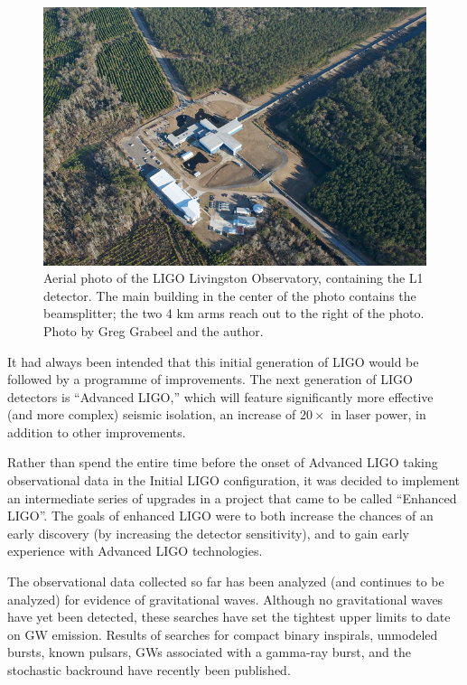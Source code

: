 \begin{figure}
\centerline{\includegraphics[width=0.8\columnwidth]{figures/5413583267_69eb527273_z.jpg}}
\caption[Aerial photo of LIGO Livingston Observatory]{
\label{fig:aerial-photo}Aerial photo of the LIGO Livingston Observatory, 
containing the L1 detector.  The main building in the center of the photo
contains the beamsplitter; the two 4 km arms reach out to the right of the 
photo.  Photo by Greg Grabeel and the author.  }
\end{figure}

It had always been intended that this initial generation of LIGO would
be followed by a programme of improvements\cite{Abramovici1992LIGO}.  The next generation of
LIGO detectors is ``Advanced LIGO,'' which will feature significantly
more effective (and more complex) seismic isolation, an increase of
$20\times$ in laser power, in addition to other improvements.

Rather than spend the entire time before the onset of Advanced LIGO
taking observational data in the Initial LIGO configuration, it was
decided to implement an intermediate series of upgrades in a project
that came to be called ``Enhanced
LIGO''\cite{Adhikari2006Enhanced,T050252,JoshSmithEnhancedAdvanced}.
The goals of enhanced LIGO were to both increase the chances of an
early discovery (by increasing the detector sensitivity), and to gain
early experience with Advanced LIGO technologies.

The observational data collected so far has been analyzed (and
continues to be analyzed) for evidence of gravitational waves.
Although no gravitational waves have yet been detected, these searches
have set the tightest upper limits to date on GW emission.  Results of
searches for compact binary inspirals\cite{S5CBCnospin, S5CBC5months},
unmodeled bursts\cite{S5burst}, known pulsars\cite{S5knownpulsars},
GWs associated with a gamma-ray burst\cite{S5GRB070201},
and the stochastic backround\cite{S5NatureStochastic} have recently
been published.

